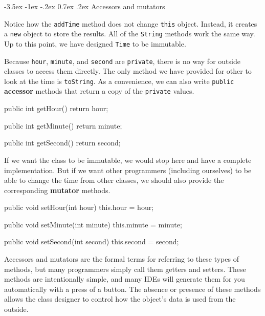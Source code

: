 \documentclass[12pt]{book}
\makeatletter
\theoremstyle{exercise}
\newcommand{\java}[1]{\verb"#1"}
\renewcommand{\section}{\@startsection {section}{1}{\z@}%
    {-3.5ex \@plus -1ex \@minus -.2ex}%
    {0.7ex \@plus.2ex}%
    {\normalfont\Large\bfseries}}
\newcommand{\java}[1]{\lstinline{#1}} %
\makeatother
\begin{document}
\section{Accessors and mutators}


Notice how the \java{addTime} method does not change \java{this} object.
Instead, it creates a \java{new} object to store the results.
All of the \java{String} methods work the same way.
Up to this point, we have designed \java{Time} to be immutable.


Because \java{hour}, \java{minute}, and \java{second} are \java{private}, there is no way for outside classes to access them directly.
The only method we have provided for other to look at the time is \java{toString}.
As a convenience, we can also write \java{public} {\bf accessor} methods that return a copy of the \java{private} values.

\begin{code}
    public int getHour() {
        return hour;
    }

    public int getMinute() {
        return minute;
    }

    public int getSecond() {
        return second;
    }
\end{code}


If we want the class to be immutable, we would stop here and have a complete implementation.
But if we want other programmers (including ourselves) to be able to change the time from other classes, we should also provide the corresponding {\bf mutator} methods.

\begin{code}
    public void setHour(int hour) {
        this.hour = hour;
    }

    public void setMinute(int minute) {
        this.minute = minute;
    }

    public void setSecond(int second) {
        this.second = second;
    }
\end{code}

Accessors and mutators are the formal terms for referring to these types of methods, but many programmers simply call them getters and setters.
These methods are intentionally simple, and many IDEs will generate them for you automatically with a press of a button.
The absence or presence of these methods allows the class designer to control how the object's data is used from the outside.
\end{document}
